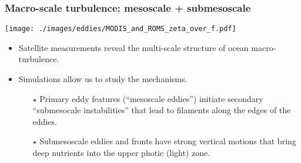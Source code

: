 \documentclass[10pt]{beamer}
\begin{document}
\begin{frame}
  \frametitle{Macro-scale turbulence: mesoscale + submesoscale}

\begin{center}
\vspace{-.45cm}
{\texttt{[image: ./images/eddies/MODIS\_and\_ROMS\_zeta\_over\_f.pdf]}}
\end{center}
\vspace{-.6cm} 


\begin{exampleblock}{}
\begin{itemize}

\item Satellite measurements reveal the multi-scale structure of ocean
  macro-turbulence.

\item Simulations allow us to study the mechanisms.
   \begin{itemize}
   \item[$\star$] Primary eddy features (``mesoscale eddies'')
     initiate secondary ``submesocale instabilities'' that lead to
     filaments along the edges of the eddies.
   \item[$\star$] Submesoscale eddies and fronts have strong vertical
     motions that bring deep nutrients into the upper photic (light)
     zone.
   \end{itemize}

\end{itemize}
\end{exampleblock}{}

                           

\end{frame}
\end{document}
